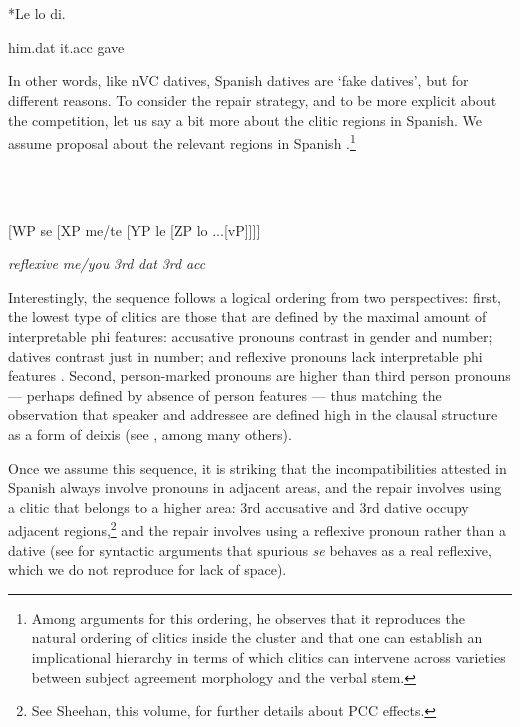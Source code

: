 \documentclass[output=paper,colorlinks,citecolor=brown]{./langscibook}
\begin{document}
\ea%
    \label{ex:key:21}
    \gll\\
        \\
    \glt
    \z

        *Le       lo       di.

    him.dat    it.acc    gave

In other words, like nVC datives, Spanish datives are ‘fake datives’, but for different reasons. To consider the repair strategy, and to be more explicit about the competition, let us say a bit more about the clitic regions in Spanish. We assume \citet{Kayne2010} proposal about the relevant regions in Spanish .\footnote{Among \citet{Kayne2010} arguments for this ordering, he observes that it reproduces the natural ordering of clitics inside the cluster and that one can establish an implicational hierarchy in terms of which clitics can intervene across varieties between subject agreement morphology and the verbal stem.}   

\ea%
    \label{ex:key:22}
    \gll\\
        \\
    \glt
    \z

         [WP  se  [XP  me/te  [YP  le  [ZP  lo ...[vP]]]]

    \textit{reflexive}  \textit{me/you}  \textit{3rd} \textit{dat}  \textit{3rd} \textit{acc}  

Interestingly, the sequence follows a logical ordering from two perspectives: first, the lowest type of clitics are those that are defined by the maximal amount of interpretable phi features: accusative pronouns contrast in gender and number; datives contrast just in number; and reflexive pronouns lack interpretable phi features \citep{Reuland2011}. Second, person{}-marked pronouns are higher than third person pronouns — perhaps defined by absence of person features — thus matching the observation that speaker and addressee are defined high in the clausal structure as a form of deixis (see \citealt{Giorgi2009}, among many others). 

Once we assume this sequence, it is striking that the incompatibilities attested in Spanish always involve pronouns in adjacent areas, and the repair involves using a clitic that belongs to a higher area: 3rd accusative and 3rd dative occupy adjacent regions,\footnote{See Sheehan, this volume, for further details about PCC effects.} and the repair involves using a reflexive pronoun rather than a dative (see \citealt{Alcaraz2017} for syntactic arguments that spurious \textit{se} behaves as a real reflexive, which we do not reproduce for lack of space).
\end{document}
